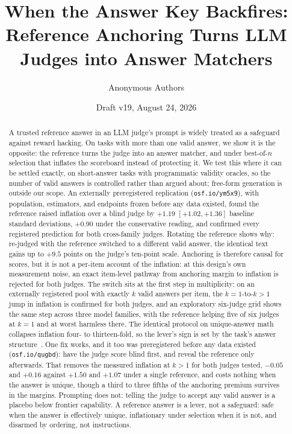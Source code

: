 \documentclass[11pt]{article}
\title{When the Answer Key Backfires:\\ \large Reference Anchoring Turns LLM Judges into Answer Matchers}
\author{Anonymous Authors}
\date{Draft v19, August 24, 2026}
\begin{document}
\maketitle

\begin{abstract}
\noindent
A trusted reference answer in an LLM judge's prompt is widely treated as a safeguard against reward hacking.
On tasks with more than one valid answer, we show it is the opposite: the reference turns the judge into an answer matcher, and under best-of-$n$ selection that inflates the scoreboard instead of protecting it.
We test this where it can be settled exactly, on short-answer tasks with programmatic validity oracles, so the number of valid answers is controlled rather than argued about; free-form generation is outside our scope.
An externally preregistered replication (\texttt{osf.io/ym5x9}), with population, estimators, and endpoints frozen before any data existed, found the reference raised inflation over a blind judge by $+1.19$ $[+1.02, +1.36]$ baseline standard deviations, $+0.90$ under the conservative reading, and confirmed every registered prediction for both cross-family judges.
Rotating the reference shows why: re-judged with the reference switched to a different valid answer, the identical text gains up to $+9.5$ points on the judge's ten-point scale.
Anchoring is therefore causal for scores, but it is not a per-item account of the inflation: at this design's own measurement noise, an exact item-level pathway from anchoring margin to inflation is rejected for both judges.
The switch sits at the first step in multiplicity: on an externally registered pool with exactly $k$ valid answers per item, the $k{=}1$-to-$k{>}1$ jump in inflation is confirmed for both judges, and an exploratory six-judge grid shows the same step across three model families, with the reference helping five of six judges at $k{=}1$ and at worst harmless there.
The identical protocol on unique-answer math collapses inflation four- to thirteen-fold, so the lever's sign is set by the task's answer structure~\cite{companionA}.
One fix works, and it too was preregistered before any data existed (\texttt{osf.io/qugbd}): have the judge score blind first, and reveal the reference only afterwards.
That removes the measured inflation at $k{>}1$ for both judges tested, $-0.05$ and $+0.16$ against $+1.50$ and $+1.07$ under a single reference, and costs nothing when the answer is unique, though a third to three fifths of the anchoring premium survives in the margins.
Prompting does not: telling the judge to accept any valid answer is a placebo below frontier capability.
A reference answer is a lever, not a safeguard: safe when the answer is effectively unique, inflationary under selection when it is not, and disarmed by ordering, not instructions.
\end{abstract}
\end{document}
